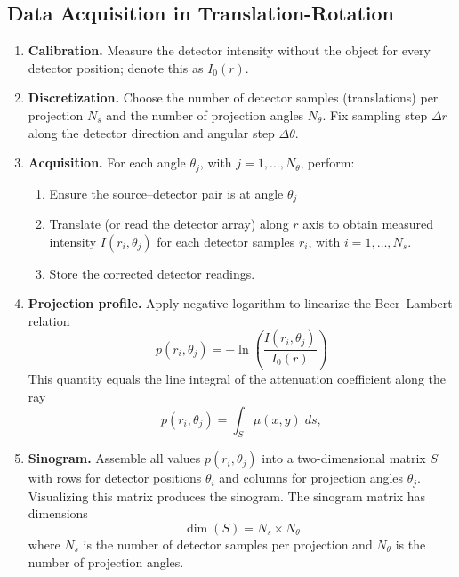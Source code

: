 \documentclass[../../../main.tex]{subfiles}
\begin{document}
\subsection{Data Acquisition in Translation-Rotation}
\begin{enumerate}
    \item \textbf{Calibration.} Measure the detector intensity without the object for every detector position; denote this as $I_0(r)$.
    \item \textbf{Discretization.} Choose the number of detector samples (translations) per projection $N_s$ and the number of projection angles $N_\theta$. Fix sampling step $\Delta r$ along the detector direction and angular step $\Delta \theta$.
    \item \textbf{Acquisition.} For each angle $\theta_j$, with $j=1,\dots,N_\theta$, perform:
          \begin{enumerate}
              \item Ensure the source–detector pair is at angle $\theta_j$
              \item Translate (or read the detector array) along $r$ axis to obtain measured intensity $I(r_i,\theta_j)$ for each detector samples $r_i$, with $i=1,\dots,N_s$.
              \item Store the corrected detector readings.
          \end{enumerate}
    \item \textbf{Projection profile.} Apply negative logarithm to linearize the Beer–Lambert relation
          \begin{equation*}
              p(r_i,\theta_j)=-\ln \left( \frac{I(r_i,\theta_j)}{I_0(r)} \right)
          \end{equation*}
          This quantity equals the line integral of the attenuation coefficient along the ray
          \begin{equation*}
              p(r_i,\theta_j)
              = \int_{S} \mu(x,y) \; ds,
          \end{equation*}
    \item \textbf{Sinogram.} Assemble all values $p(r_i,\theta_j)$ into a two-dimensional matrix $S$ with rows for detector positions $\theta_i$ and columns for projection angles $\theta_j$. Visualizing this matrix produces the sinogram. The sinogram matrix has dimensions
          \begin{equation*}
              \dim (S)=N_s\times N_\theta
          \end{equation*}
          where $N_s$ is the number of detector samples per projection and $N_\theta$ is the number of projection angles.
\end{enumerate}
\end{document}
